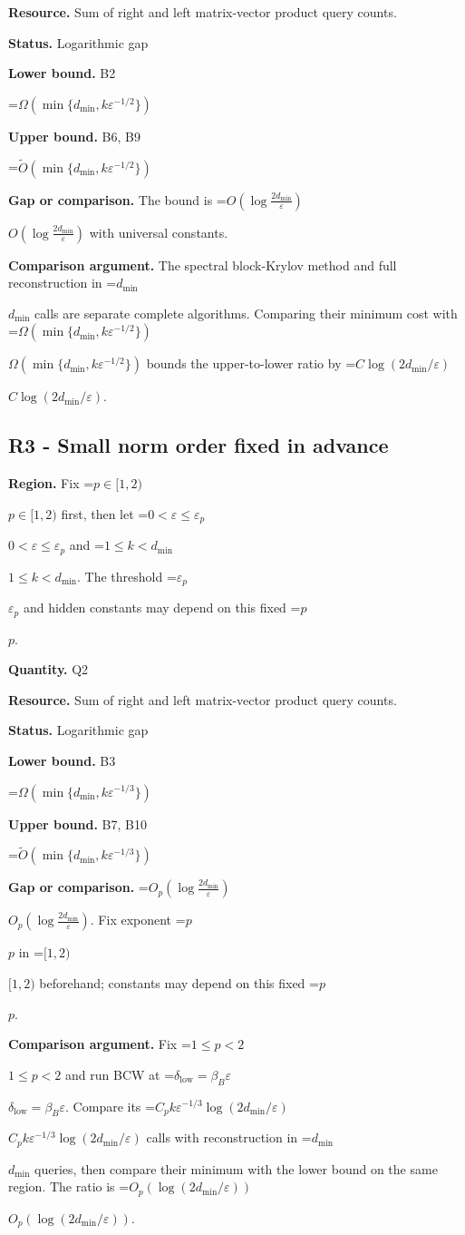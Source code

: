 \documentclass[10pt,a4paper]{article}
\newcommand{\AtlasMath}[1]{\par\begingroup\centering\setbox0=\hbox{$\displaystyle #1$}\ifdim\wd0>1.4\linewidth\typeout{ATLAS WIDE FORMULA: \the\wd0}\fi\ifdim\wd0>\linewidth\resizebox{\linewidth}{!}{\box0}\else\box0\fi\par\endgroup}
\newcommand{\AtlasInlineMath}[1]{\begingroup\setbox0=\hbox{$#1$}\ifdim\wd0>.4\linewidth\endgroup\AtlasMath{#1}\else\endgroup$#1$\fi}
\begin{document}
\textbf{Resource.} Sum of right and left matrix-vector product query counts.

\textbf{Status.} Logarithmic gap

\textbf{Lower bound.} B2

\AtlasMath{\Omega(\min\{d_{\mathrm{min}},k\varepsilon^{-1/2}\})}
\textbf{Upper bound.} B6, B9

\AtlasMath{\widetilde{O}(\min\{d_{\mathrm{min}},k\varepsilon^{-1/2}\})}
\textbf{Gap or comparison.} The bound is \AtlasInlineMath{O\!\left(\log\!\frac{2d_{\mathrm{min}}}{\varepsilon}\right)} with universal constants.

\textbf{Comparison argument.} The spectral block-Krylov method and full reconstruction in \AtlasInlineMath{d_{\mathrm{min}}} calls are separate complete algorithms. Comparing their minimum cost with \AtlasInlineMath{\Omega(\min\{d_{\mathrm{min}},k\varepsilon^{-1/2}\})} bounds the upper-to-lower ratio by \AtlasInlineMath{C\log(2d_{\mathrm{min}}/\varepsilon)}.

\subsection{R3 - Small norm order fixed in advance}
\textbf{Region.} Fix \AtlasInlineMath{p\in[1,2)} first, then let \AtlasInlineMath{0<\varepsilon\le\varepsilon_p} and \AtlasInlineMath{1\le k<d_{\mathrm{min}}}. The threshold \AtlasInlineMath{\varepsilon_p} and hidden constants may depend on this fixed \AtlasInlineMath{p}.

\textbf{Quantity.} Q2

\textbf{Resource.} Sum of right and left matrix-vector product query counts.

\textbf{Status.} Logarithmic gap

\textbf{Lower bound.} B3

\AtlasMath{\Omega(\min\{d_{\mathrm{min}},k\varepsilon^{-1/3}\})}
\textbf{Upper bound.} B7, B10

\AtlasMath{\widetilde{O}(\min\{d_{\mathrm{min}},k\varepsilon^{-1/3}\})}
\textbf{Gap or comparison.} \AtlasInlineMath{O_p\!\left(\log\!\frac{2d_{\mathrm{min}}}{\varepsilon}\right)}. Fix exponent \AtlasInlineMath{p} in \AtlasInlineMath{[1,2)} beforehand; constants may depend on this fixed \AtlasInlineMath{p}.

\textbf{Comparison argument.} Fix \AtlasInlineMath{1\le p<2} and run BCW at \AtlasInlineMath{\delta_{\mathrm{low}}=\beta_B\varepsilon}. Compare its \AtlasInlineMath{C_p k\varepsilon^{-1/3}\log(2d_{\mathrm{min}}/\varepsilon)} calls with reconstruction in \AtlasInlineMath{d_{\mathrm{min}}} queries, then compare their minimum with the lower bound on the same region. The ratio is \AtlasInlineMath{O_p(\log(2d_{\mathrm{min}}/\varepsilon))}.
\end{document}
